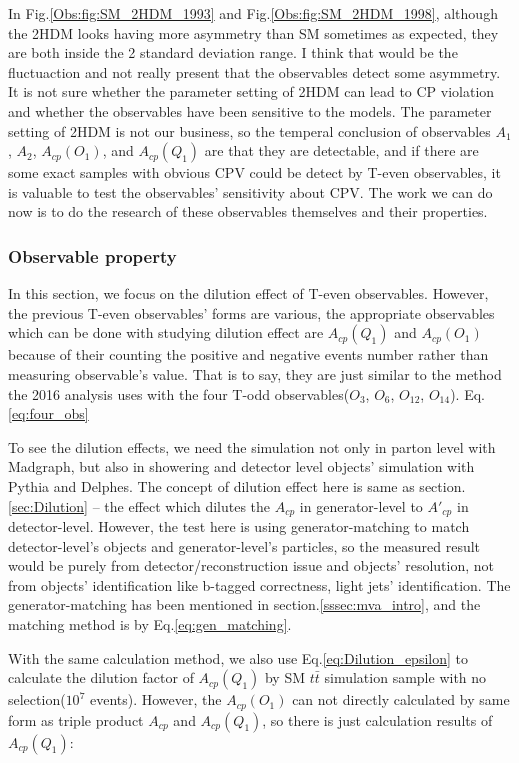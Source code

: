 			In Fig.\ref{Obs:fig:SM_2HDM_1993} and Fig.\ref{Obs:fig:SM_2HDM_1998}, although the 2HDM looks having more asymmetry than SM sometimes as expected, they are both inside the 2 standard deviation range. I think that would be the fluctuaction and not really present that the observables detect some asymmetry. It is not sure whether the parameter setting of 2HDM can lead to CP violation and whether the observables have been sensitive to the models. The parameter setting of 2HDM is not our business, so the temperal conclusion of observables $A_1$, $A_2$, $A_{cp}(O_1)$, and $A_{cp}(Q_1)$ are that they are detectable, and if there are some exact samples with obvious CPV could be detect by T-even observables, it is valuable to test the observables' sensitivity about CPV. The work we can do now is to do the research of these observables themselves and their properties.

		\subsubsection{Observable property}
		\label{sssec:AcpObs_property}

			In this section, we focus on the dilution effect of T-even observables. However, the previous T-even observables' forms are various, the appropriate observables which can be done with studying dilution effect are $A_{cp}(Q_1)$ and $A_{cp}(O_1)$ because of their counting the positive and negative events number rather than measuring observable's value. That is to say, they are just similar to the method the 2016 analysis uses with the four T-odd observables($O_3$, $O_6$, $O_{12}$, $O_{14}$). Eq.\ref{eq:four_obs}

			To see the dilution effects, we need the simulation not only in parton level with Madgraph, but also in showering and detector level objects' simulation with Pythia and Delphes. The concept of dilution effect here is same as section.\ref{sec:Dilution} -- the effect which dilutes the $A_{cp}$ in generator-level to $A'_{cp}$ in detector-level. However, the test here is using generator-matching to match detector-level's objects and generator-level's particles, so the measured result would be purely from detector/reconstruction issue and objects' resolution, not from objects' identification like b-tagged correctness, light jets' identification. The generator-matching has been mentioned in section.\ref{sssec:mva_intro}, and the matching method is by Eq.\ref{eq:gen_matching}.

			With the same calculation method, we also use Eq.\ref{eq:Dilution_epsilon} to calculate the dilution factor of $A_{cp}(Q_1)$ by SM $t\bar{t}$ simulation sample with no selection($10^7$ events). However, the $A_{cp}(O_1)$ can not directly calculated by same form as triple product $A_{cp}$ and $A_{cp}(Q_1)$, so there is just calculation results of $A_{cp}(Q_1)$:

